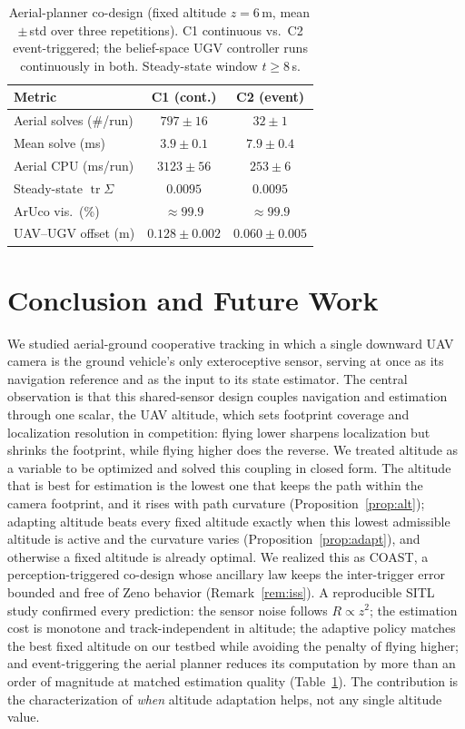 \documentclass{ifacconf}
\DeclareMathOperator{\tr}{tr}
\newcommand{\RESsolvesCone}{\ensuremath{797\pm16}}\newcommand{\RESsolvesCthree}{\ensuremath{32\pm1}}
\newcommand{\RESmsCone}{\ensuremath{3.9\pm0.1}}\newcommand{\RESmsCthree}{\ensuremath{7.9\pm0.4}}
\newcommand{\REScpuCone}{\ensuremath{3123\pm56}}\newcommand{\REScpuCthree}{\ensuremath{253\pm6}}
\newcommand{\RESoffCone}{\ensuremath{0.128\pm0.002}}\newcommand{\RESoffCthree}{\ensuremath{0.060\pm0.005}}
\newcommand{\REScov}{\ensuremath{0.0095}}\newcommand{\RESsolveRed}{25}\newcommand{\REScpuRed}{12}
\begin{document}
\begin{table}[h]
\caption{Aerial-planner co-design (fixed altitude $z=6$\,m, mean\,$\pm$\,std over three repetitions). C1
continuous vs.\ C2 event-triggered; the belief-space UGV controller runs continuously in both.
Steady-state window $t\!\ge\!8$\,s.}
\label{tab:results}
\begin{center}
\footnotesize
\setlength{\tabcolsep}{3pt}
\begin{tabular}{|l|c|c|}
\hline
{\textbf{Metric}} & {\textbf{C1 (cont.)}} & {\textbf{C2 (event)}}\\
\hline
Aerial solves (\#/run) & \RESsolvesCone & \RESsolvesCthree\\
\hline
Mean solve (ms) & \RESmsCone & \RESmsCthree\\
\hline
Aerial CPU (ms/run) & \REScpuCone & \REScpuCthree\\
\hline
Steady-state $\tr\Sigma$ & \REScov & \REScov\\
\hline
ArUco vis.\ (\%) & $\approx99.9$ & $\approx99.9$\\
\hline
UAV--UGV offset (m) & \RESoffCone & \RESoffCthree\\
\hline
\end{tabular}
\end{center}
\end{table}

\section{Conclusion and Future Work}
We studied aerial-ground cooperative tracking in which a single downward UAV camera is the ground
vehicle's only exteroceptive sensor, serving at once as its navigation reference and as the input to its
state estimator. The central observation is that this shared-sensor design couples navigation and
estimation through one scalar, the UAV altitude, which sets footprint coverage and localization resolution
in competition: flying lower sharpens localization but shrinks the footprint, while flying higher does the
reverse. We treated altitude as a variable to be optimized and solved this coupling in closed form. The
altitude that is best for estimation is the lowest one that keeps the path within the camera footprint, and
it rises with path curvature (Proposition~\ref{prop:alt}); adapting altitude beats every fixed altitude
exactly when this lowest admissible altitude is active and the curvature varies (Proposition~\ref{prop:adapt}),
and otherwise a fixed altitude is already optimal. We realized this as COAST, a perception-triggered
co-design whose ancillary law keeps the inter-trigger error bounded and free of Zeno behavior
(Remark~\ref{rem:iss}). A reproducible SITL study confirmed every prediction: the sensor noise follows
$R\propto z^2$; the estimation cost is monotone and track-independent in altitude; the adaptive policy
matches the best fixed altitude on our testbed while avoiding the penalty of flying higher; and
event-triggering the aerial planner reduces its computation by more than an order of magnitude at matched
estimation quality (Table~\ref{tab:results}). The contribution is the characterization of \emph{when}
altitude adaptation helps, not any single altitude value.
\end{document}
